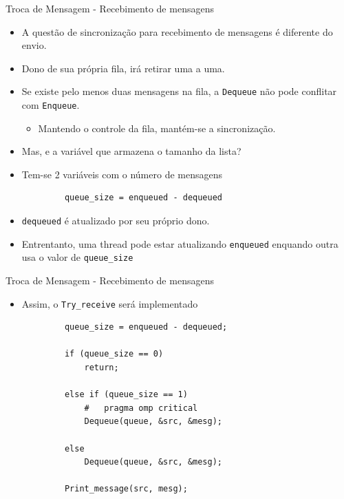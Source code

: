 	\begin{frame}[fragile]{Troca de Mensagem -  Recebimento de mensagens}
		\begin{itemize}
			\item A questão de sincronização para recebimento de mensagens é diferente do envio.
			\item Dono de sua própria fila, irá retirar uma a uma.
			\item Se existe pelo menos duas mensagens na fila, a {\tt Dequeue} não pode conflitar com {\tt Enqueue}.
			\begin{itemize}
				\item Mantendo o controle da fila, mantém-se a sincronização.
			\end{itemize}
					\bigskip
			\item Mas, e a variável que armazena o tamanho da lista?
			\item Tem-se 2 variáveis com o número de mensagens
		\end{itemize}
		\begin{verbatim}
			queue_size = enqueued - dequeued
		\end{verbatim}
		\begin{itemize}
			\item {\tt dequeued} é atualizado por seu próprio dono.
			\item Entrentanto, uma thread pode estar atualizando {\tt enqueued} enquando outra usa o valor de {\tt queue\_size}
		\end{itemize}
\end{frame}

	\begin{frame}[fragile]{Troca de Mensagem -  Recebimento de mensagens}
		\begin{itemize}
			\item Assim, o {\tt Try\_receive} será implementado
		\end{itemize}
		\begin{verbatim}
			queue_size = enqueued - dequeued;

			if (queue_size == 0) 
				return;

			else if (queue_size == 1)
				#	pragma omp critical
				Dequeue(queue, &src, &mesg);

			else
				Dequeue(queue, &src, &mesg);

			Print_message(src, mesg);
		\end{verbatim}
\end{frame}

